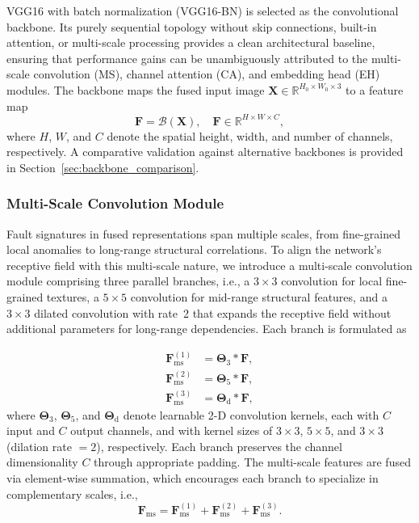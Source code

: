 \documentclass[pdflatex,sn-mathphys-num]{sn-jnl}
\theoremstyle{thmstyleone}%
\theoremstyle{thmstyletwo}%
\theoremstyle{thmstylethree}%
\begin{document}
VGG16 with batch normalization (VGG16-BN) is selected as the convolutional backbone. Its purely sequential topology without skip connections, built-in attention, or multi-scale processing provides a clean architectural baseline, ensuring that performance gains can be unambiguously attributed to the multi-scale convolution (MS), channel attention (CA), and embedding head (EH) modules. The backbone maps the fused input image $\boldsymbol{X} \in \mathbb{R}^{H_0 \times W_0 \times 3}$ to a feature map
\begin{equation}
\boldsymbol{F} = \mathcal{B}(\boldsymbol{X}), \quad \boldsymbol{F} \in \mathbb{R}^{H \times W \times C},
\label{eq:feature_map}
\end{equation}
where $H$, $W$, and $C$ denote the spatial height, width, and number of channels, respectively. A comparative validation against alternative backbones is provided in Section~\ref{sec:backbone_comparison}.

\subsubsection{Multi-Scale Convolution Module}

Fault signatures in fused representations span multiple scales, from fine-grained local anomalies to long-range structural correlations. To align the network's receptive field with this multi-scale nature, we introduce a multi-scale convolution module comprising three parallel branches, i.e., a $3\times3$ convolution for local fine-grained textures, a $5\times5$ convolution for mid-range structural features, and a $3\times3$ dilated convolution with rate~2 that expands the receptive field without additional parameters for long-range dependencies. Each branch is formulated as

\begin{equation}
\begin{aligned}
\boldsymbol{F}_{\mathrm{ms}}^{(1)} &= \boldsymbol{\Theta}_{3} * \boldsymbol{F}, \\
\boldsymbol{F}_{\mathrm{ms}}^{(2)} &= \boldsymbol{\Theta}_{5} * \boldsymbol{F}, \\
\boldsymbol{F}_{\mathrm{ms}}^{(3)} &= \boldsymbol{\Theta}_{\mathrm{d}} * \boldsymbol{F},
\end{aligned}
\label{eq:multi_scale_branches}
\end{equation}
where $\boldsymbol{\Theta}_{3}$, $\boldsymbol{\Theta}_{5}$, and $\boldsymbol{\Theta}_{\mathrm{d}}$ denote learnable 2-D convolution kernels, each with $C$ input and $C$ output channels, and with kernel sizes of $3\times3$, $5\times5$, and $3\times3$ (dilation rate $=2$), respectively. Each branch preserves the channel dimensionality $C$ through appropriate padding. The multi-scale features are fused via element-wise summation, which encourages each branch to specialize in complementary scales, i.e.,
\begin{equation}
\boldsymbol{F}_{\mathrm{ms}} = \boldsymbol{F}_{\mathrm{ms}}^{(1)} + \boldsymbol{F}_{\mathrm{ms}}^{(2)} + \boldsymbol{F}_{\mathrm{ms}}^{(3)}.
\label{eq:multi_scale_fusion}
\end{equation}
\end{document}
